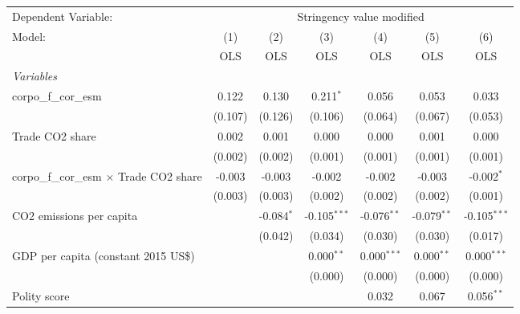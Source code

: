 
\begingroup
\centering
\begin{tabular}{lcccccc}
   \toprule
   Dependent Variable: & \multicolumn{6}{c}{Stringency value modified}\\
   Model:                                          & (1)     & (2)          & (3)            & (4)           & (5)           & (6)\\  
                                                   &  OLS    & OLS          & OLS            & OLS           & OLS           & OLS\\  
   \midrule
   \emph{Variables}\\
   corpo\_f\_cor\_esm                              & 0.122   & 0.130        & 0.211$^{*}$    & 0.056         & 0.053         & 0.033\\   
                                                   & (0.107) & (0.126)      & (0.106)        & (0.064)       & (0.067)       & (0.053)\\   
   Trade CO2 share                                 & 0.002   & 0.001        & 0.000          & 0.000         & 0.001         & 0.000\\   
                                                   & (0.002) & (0.002)      & (0.001)        & (0.001)       & (0.001)       & (0.001)\\   
   corpo\_f\_cor\_esm $\times$ Trade CO2 share     & -0.003  & -0.003       & -0.002         & -0.002        & -0.003        & -0.002$^{*}$\\   
                                                   & (0.003) & (0.003)      & (0.002)        & (0.002)       & (0.002)       & (0.001)\\   
   CO2 emissions per capita                        &         & -0.084$^{*}$ & -0.105$^{***}$ & -0.076$^{**}$ & -0.079$^{**}$ & -0.105$^{***}$\\   
                                                   &         & (0.042)      & (0.034)        & (0.030)       & (0.030)       & (0.017)\\   
   GDP per capita (constant 2015 US\$)             &         &              & 0.000$^{**}$   & 0.000$^{***}$ & 0.000$^{**}$  & 0.000$^{***}$\\   
                                                   &         &              & (0.000)        & (0.000)       & (0.000)       & (0.000)\\   
   Polity score                                    &         &              &                & 0.032         & 0.067         & 0.056$^{**}$\\   

\end{tabular}
